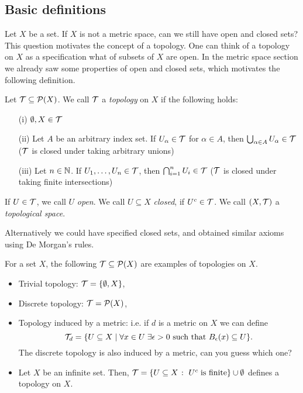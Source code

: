 \documentclass{article}
\begin{document}
\subsection{Basic definitions}

Let $X$ be a set. If $X$ is not a metric space, can we still have open and closed sets? This question motivates the concept of a topology. One can think of a topology on $X$ as a specification what of subsets of $X$ are open. In the metric space section we already saw some properties of open and closed sets, which motivates the following definition. 

\begin{definition}
Let $\mathcal{T}\subseteq \mathcal{P}(X)$. We call $\mathcal{T}$ a \emph{topology} on $X$ if the following holds:
\begin{itemize}
    \item[(i)] $\emptyset, X \in \mathcal{T}$
    \item[(ii)] Let $A$ be an arbitrary index set. If $U_\alpha \in \mathcal{T}$ for $\alpha\in A$, then $\bigcup_{\alpha \in A} U_\alpha \in \mathcal{T}$ ($\mathcal{T}$ is closed under taking arbitrary unions)
    \item[(iii)] Let $n \in {\mathbb{N}}$. If $U_1, \ldots, U_n \in \mathcal{T}$, then $\bigcap_{i=1}^n U_i \in \mathcal{T}$ ($\mathcal{T}$ is closed under taking finite intersections)
\end{itemize}
If $U\in \mathcal{T}$, we call $U$ \emph{open}. We call $U\subseteq X$ \emph{closed}, if $U^c\in \mathcal{T}$. We call $(X,\mathcal{T})$ a \emph{topological space}.
\end{definition}

Alternatively we could have specified closed sets, and obtained similar axioms using De Morgan's rules. 

\begin{example}
For a set $X$, the following $\mathcal{T} \subseteq \mathcal{P}(X)$ are examples of topologies on $X$.
\begin{itemize}
    \item Trivial topology: $\mathcal{T} = \{\emptyset, X\}$,
    \item Discrete topology: $\mathcal{T}=\mathcal{P}(X)$,
    \item Topology induced by a metric: i.e. if $d$ is a metric on $X$ we can define 
    $$\mathcal{T}_d = \{U \subseteq X \; \vert \; \forall x \in U \; \exists \epsilon>0 \text{ such that } B_\epsilon(x) \subseteq U \}.$$
    The discrete topology is also induced by a metric, can you guess which one?
    \item Let $X$ be an infinite set. Then, $\mathcal{T} = \{U \subseteq X \;\colon\; U^c \; \text{is finite}\}\cup \emptyset$ defines a topology on $X$.
\end{itemize}
\end{example}
\end{document}
